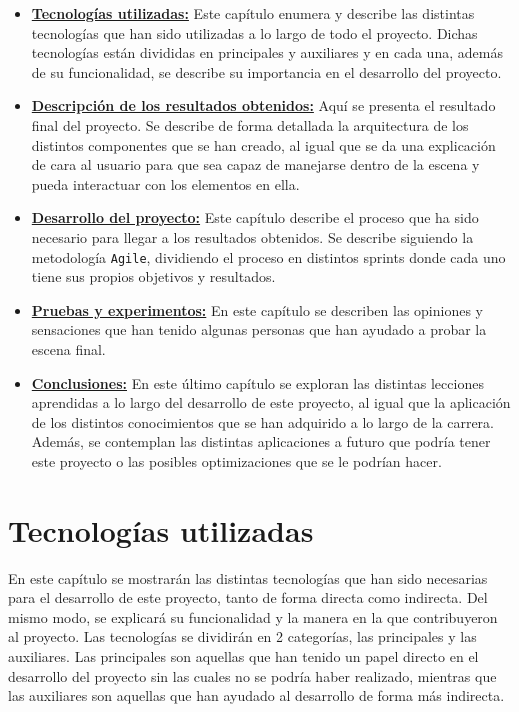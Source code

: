 \documentclass[a4paper, 12pt]{book}
\begin{document}
\begin{itemize}
  \item \hyperref[chap:tecnologias]{\textbf{Tecnologías utilizadas:}} Este capítulo enumera y describe las distintas tecnologías que han sido utilizadas a lo largo de todo el proyecto. Dichas tecnologías están divididas en principales y auxiliares y en cada una, además de su funcionalidad, se describe su importancia en el desarrollo del proyecto.
  \item \hyperref[chap:resultados]{\textbf{Descripción de los resultados obtenidos:}} Aquí se presenta el resultado final del proyecto. Se describe de forma detallada la arquitectura de los distintos componentes que se han creado, al igual que se da una explicación de cara al usuario para que sea capaz de manejarse dentro de la escena y pueda interactuar con los elementos en ella. 
  \item \hyperref[chap:Desarrollo del proyecto]{\textbf{Desarrollo del proyecto:}} Este capítulo describe el proceso que ha sido necesario para llegar a los resultados obtenidos. Se describe siguiendo la metodología \texttt{Agile}, dividiendo el proceso en distintos sprints donde cada uno tiene sus propios objetivos y resultados.
  \item \hyperref[chap:pruebas-experimentos]{\textbf{Pruebas y experimentos:}} En este capítulo se describen las opiniones y sensaciones que han tenido algunas personas que han ayudado a probar la escena final. 
  \item \hyperref[chap:conclusiones]{\textbf{Conclusiones:}} En este último capítulo se exploran las distintas lecciones aprendidas a lo largo del desarrollo de este proyecto, al igual que la aplicación de los distintos conocimientos que se han adquirido a lo largo de la carrera. Además, se contemplan las distintas aplicaciones a futuro que podría tener este proyecto o las posibles optimizaciones que se le podrían hacer.
\end{itemize}



\cleardoublepage %
\chapter{Tecnologías utilizadas} 
\label{chap:tecnologias} %
En este capítulo se mostrarán las distintas tecnologías que han sido necesarias para el desarrollo de este proyecto, tanto de forma directa como indirecta. Del mismo modo, se explicará su funcionalidad
y la manera en la que contribuyeron al proyecto. Las tecnologías se dividirán en 2 categorías, las principales y las auxiliares. Las principales son aquellas que han tenido un papel directo en el desarrollo 
del proyecto sin las cuales no se podría haber realizado, mientras que las auxiliares son aquellas que han ayudado al desarrollo de forma más indirecta.  
\end{document}
